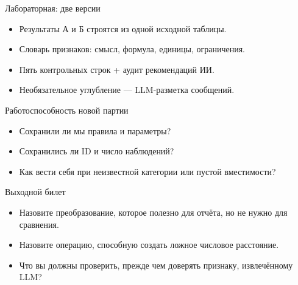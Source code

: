 \documentclass[aspectratio=169,10pt]{beamer}
\begin{document}
\begin{frame}[t]{Лабораторная: две версии}
\begin{itemize}
\item Результаты А и Б строятся из одной исходной таблицы.
\vspace{4pt}
\item Словарь признаков: смысл, формула, единицы, ограничения.
\vspace{4pt}
\item Пять контрольных строк + аудит рекомендаций ИИ.
\vspace{4pt}
\item Необязательное углубление — LLM-разметка сообщений.
\vspace{4pt}
\end{itemize}
\end{frame}
\begin{frame}[t]{Работоспособность новой партии}
\begin{itemize}
\item Сохранили ли мы правила и параметры?
\vspace{4pt}
\item Сохранились ли ID и число наблюдений?
\vspace{4pt}
\item Как вести себя при неизвестной категории или пустой вместимости?
\vspace{4pt}
\end{itemize}
\end{frame}
\begin{frame}[t]{Выходной билет}
\begin{itemize}
\item Назовите преобразование, которое полезно для отчёта, но не нужно для сравнения.
\vspace{4pt}
\item Назовите операцию, способную создать ложное числовое расстояние.
\vspace{4pt}
\item Что вы должны проверить, прежде чем доверять признаку, извлечённому LLM?
\vspace{4pt}
\end{itemize}
\end{frame}
\end{document}

